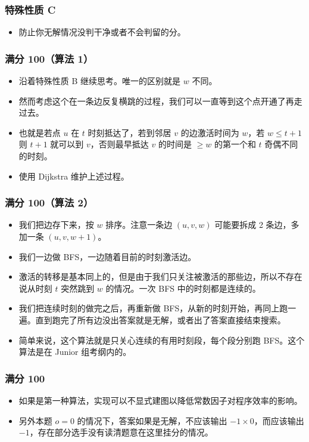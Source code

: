 \documentclass[aspectratio=169]{ctexbeamer}
\begin{document}
\begin{frame}
  \frametitle{特殊性质 C}

  \begin{itemize}
    \item <1 - > 防止你无解情况没判干净或者不会判留的分。
  \end{itemize}

\end{frame}

\begin{frame}
  \frametitle{满分 100（算法 1）}

  \begin{itemize}
    \item <1 - > 沿着特殊性质 B 继续思考。唯一的区别就是 $w$ 不同。
    \item <2 - > 然而考虑这个在一条边反复横跳的过程，我们可以一直等到这个点开通了再走过去。
    \item <3 - > 也就是若点 $u$ 在 $t$ 时刻抵达了，若到邻居 $v$ 的边激活时间为 $w$，若 $w\leq t+1$ 则 $t+1$ 就可以到 $v$，否则最早抵达 $v$ 的时间是 $\geq w$ 的第一个和 $t$ 奇偶不同的时刻。
    \item <4 - > 使用 Dijkstra 维护上述过程。
  \end{itemize}

\end{frame}

\begin{frame}
  \frametitle{满分 100（算法 2）}

  \begin{itemize}
    \item <1 - > 我们把边存下来，按 $w$ 排序。注意一条边 $(u,v,w)$ 可能要拆成 2 条边，多加一条 $(u,v,w+1)$。
    \item <2 - > 我们一边做 BFS，一边随着目前的时刻激活边。
    \item <3 - > 激活的转移是基本同上的，但是由于我们只关注被激活的那些边，所以不存在说从时刻 $t$ 突然跳到 $w$ 的情况。一次 BFS 中的时刻都是连续的。
    \item <4 - > 我们把连续时刻的做完之后，再重新做 BFS，从新的时刻开始，再同上跑一遍。直到跑完了所有边没出答案就是无解，或者出了答案直接结束搜索。
    \item <5 - > 简单来说，这个算法就是只关心连续的有用时刻段，每个段分别跑 BFS。这个算法是在 Junior 组考纲内的。
  \end{itemize}

\end{frame}

\begin{frame}
  \frametitle{满分 100}

  \begin{itemize}
    \item <1 - > 如果是第一种算法，实现可以不显式建图以降低常数因子对程序效率的影响。
    \item <2 - > 另外本题 $o=0$ 的情况下，答案如果是无解，不应该输出 $-1\times 0$，而应该输出 $-1$，存在部分选手没有读清题意在这里挂分的情况。
  \end{itemize}
\end{frame}
\end{document}
